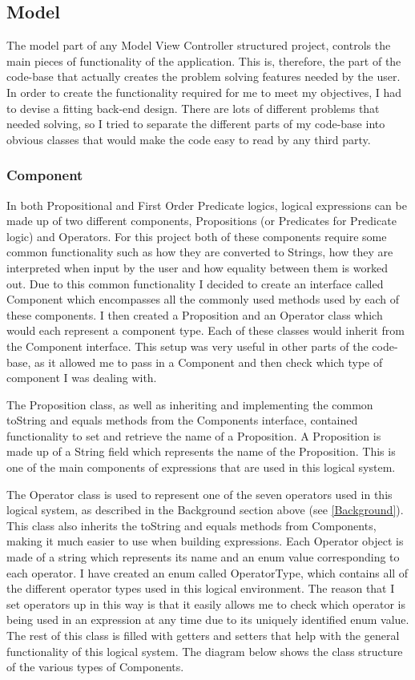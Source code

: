 \subsection{Model}
The model part of any Model View Controller structured project, controls the main pieces of functionality of the application. This is, therefore, the part of the code-base that actually creates the problem solving features needed by the user. In order to create the functionality required for me to meet my objectives, I had to devise a fitting back-end design. There are lots of different problems that needed solving, so I tried to separate the different parts of my code-base into obvious classes that would make the code easy to read by any third party.

\subsubsection{Component}
In both Propositional and First Order Predicate logics, logical expressions can be made up of two different components, Propositions (or Predicates for Predicate logic) and Operators. For this project both of these components require some common functionality such as how they are converted to Strings, how they are interpreted when input by the user and how equality between them is worked out. Due to this common functionality I decided to create an interface called Component which encompasses all the commonly used methods used by each of these components. I then created a Proposition and an Operator class which would each represent a component type. Each of these classes would inherit from the Component interface. This setup was very useful in other parts of the code-base, as it allowed me to pass in a Component and then check which type of component I was dealing with.  

The Proposition class, as well as inheriting and implementing the common toString and equals methods from the Components interface, contained functionality to set and retrieve the name of a Proposition. A Proposition is made up of a String field which represents the name of the Proposition. This is one of the main components of expressions that are used in this logical system.

The Operator class is used to represent one of the seven operators used in this logical system, as described in the Background section above (see \ref{Background}). This class also inherits the toString and equals methods from Components, making it much easier to use when building expressions. Each Operator object is made of a string which represents its name and an enum value corresponding to each operator. I have created an enum called OperatorType, which contains all of the different operator types used in this logical environment. The reason that I set operators up in this way is that it easily allows me to check which operator is being used in an expression at any time due to its uniquely identified enum value. The rest of this class is filled with getters and setters that help with the general functionality of this logical system. The diagram below shows the class structure of the various types of Components.

